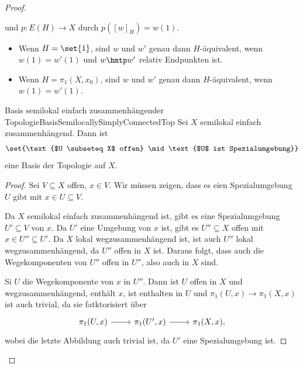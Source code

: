 \documentclass[language=ngerman]{TemplateLecture} %
\begin{document}
\begin{proof}
\begin{description}
\begin{description}
            und $p: E(H) \to X$ durch $p([w]_H) = w(1)$.
            \begin{example}
                \begin{itemize}
                    \item Wenn $H = \set{1}$, sind $w$ und $w'$ genau dann $H$-äquivalent, wenn $w(1) = w'(1)$ und $w \hmtp w'$ relativ Endpunkten ist.
                    \item Wenn $H = \pi_1(X,x_0)$, sind $w$ und $w'$ genau dann $H$-äquivalent, wenn $w(1) = w'(1)$.
                \end{itemize}
            \end{example}
            \begin{lem}{Basis semilokal einfach zusammenhängender Topologie}{BasisSemilocallySimplyConnectedTop}
                Sei $X$ semilokal einfach zusammenhängend. Dann ist 
                \begin{equation*}
                    \set{\text{$U \subseteq X$ offen} \mid \text{$U$ ist Spezialumgebung}}
                \end{equation*} 
                eine Basis der Topologie auf $X$.
            \end{lem}
            \begin{proof}
                Sei $V \subseteq X$ offen, $x \in V$. Wir müssen zeigen, dass es eien Spezialumgebung $U$ gibt mit $x \in U \subseteq V$.

                Da $X$ semilokal einfach zusammenhängend ist, gibt es eine Spezialumgebung $U' \subseteq V$ von $x$. Da $U'$ eine Umgebung von $x$ ist, gibt es $U'' \subseteq X$ offen mit $x \in U'' \subseteq U'$. Da $X$ lokal wegzusammenhängend ist, ist auch $U''$ lokal wegzusammenhängend, da $U''$ offen in $X$ ist. Daraus folgt, dass auch die Wegekomponenten von $U''$ offen in $U''$, also auch in $X$ sind.

                Si $U$ die Wegekomponente von $x$ in $U''$. Dann ist $U$ offen in $X$ und wegzusammenhängend, enthält $x$, ist enthalten in $U$ und $\pi_1(U,x) \to \pi_1(X,x)$ ist auch trivial, da sie fatktorisiert über 
                \begin{equation*}
                    \begin{tikzcd}
                        \pi_1(U, x) \arrow[r] & \pi_1(U', x) \arrow[r] &\pi_1(X,x),
                    \end{tikzcd}
                \end{equation*}
                wobei die letzte Abbildung auch trivial ist, da $U'$ eine Spezialumgebung ist.
            \end{proof}


\end{description}
\end{description}
\end{proof}
\end{document}
